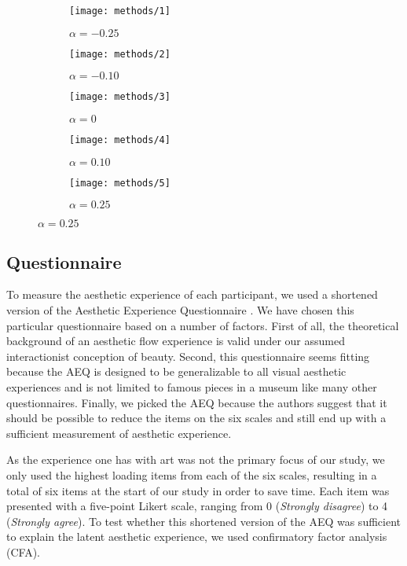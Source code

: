 \documentclass[../main.tex]{subfiles}
\begin{document}
	\begin{figure}[ht]
		\caption{Truncated Sample of an Image Sequence Produced by GANalyze}
		\label{fig:sample_sequence}
		\centering
		\begin{subfigure}{.18\textwidth}
			\centering
			\texttt{[image: methods/1]}
			\caption{\centering $\alpha = -0.25$}
		\end{subfigure} \hfill
		\begin{subfigure}{.18\textwidth}
			\centering
			\texttt{[image: methods/2]}
			\caption{\centering $\alpha = -0.10$}
		\end{subfigure} \hfill
		\begin{subfigure}{.18\textwidth}
			\centering
			\texttt{[image: methods/3]}
			\caption{\centering $\alpha = 0$}
		\end{subfigure} \hfill
		\begin{subfigure}{.18\textwidth}
			\centering
			\texttt{[image: methods/4]}
			\caption{\centering $\alpha = 0.10$}
		\end{subfigure} \hfill
		\begin{subfigure}{.18\textwidth}
			\centering
			\texttt{[image: methods/5]}
			\caption{\centering $\alpha = 0.25$}
		\end{subfigure} \hfill
	\end{figure}
	
	\subsection{Questionnaire}
	To measure the aesthetic experience of each participant, we used a shortened version of the Aesthetic Experience Questionnaire \parencite[AEQ;][]{wanzerExperiencingFlowViewing2020}. We have chosen this particular questionnaire based on a number of factors. First of all, the theoretical background of an aesthetic flow experience \parencite{csikszentmihalyi1990art} is valid under our assumed interactionist conception of beauty. Second, this questionnaire seems fitting because the AEQ is designed to be generalizable to all visual aesthetic experiences and is not limited to famous pieces in a museum like many other questionnaires. Finally, we picked the AEQ because the authors suggest that it should be possible to reduce the items on the six scales and still end up with a sufficient measurement of aesthetic experience.
	
	As the experience one has with art was not the primary focus of our study, we only used the highest loading items from each of the six scales, resulting in a total of six items at the start of our study in order to save time. Each item was presented with a five-point Likert scale, ranging from 0 (\textit{Strongly disagree}) to 4 (\textit{Strongly agree}). To test whether this shortened version of the AEQ was sufficient to explain the latent aesthetic experience, we used confirmatory factor analysis (CFA).
	
\end{document}

